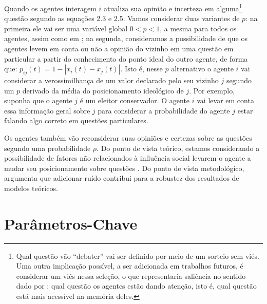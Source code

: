 Quando os agentes interagem \(i\) atualiza sua opinião e incerteza em
alguma\footnote{Qual questão vão ``debater'' vai ser definido por meio de um
  sorteio sem viés. Uma outra implicação possível, a ser adicionada em trabalhos
  futuros, é considerar um viés nessa seleção, o que representaria saliência no
  sentido dado por : qual questão os agentes estão
  dando atenção, isto é, qual questão está mais acessível na memória deles.}
questão segundo as equações 2.3 e 2.5. Vamos considerar duas variantes de \(p\):
na primeira ele vai ser uma variável global \(0 < p < 1 \), a mesma para todos
os agentes, assim como em ; na segunda,
consideramos a possibilidade de que os agentes levem em conta ou não a opinião
do vizinho em uma questão em particular a partir do conhecimento do ponto ideal
do outro agente, de forma que: \(p_{ij}(t) = 1 - |x_i(t) - x_j(t)|\). Isto é,
nesse \(p\) alternativo o agente \(i\) vai considerar a verossimilhança de um
valor declarado pelo seu vizinho \(j\) segundo um \(p\) derivado da média do
posicionamento ideológico de \(j\). Por exemplo, suponha que o agente \(j\) é um
eleitor conservador. O agente \(i\) vai levar
em conta essa informação geral sobre \(j\) para considerar a probabilidade do
agente \(j\) estar falando algo correto em questões particulares.

Os agentes também vão reconsiderar suas opiniões e certezas sobre as questões
segundo uma probabilidade \(\rho\). Do ponto de vista teórico, estamos considerando
a possibilidade de fatores não relacionados à influência social levarem o agente
a mudar seu posicionamento sobre questões \cite{flache2017, lorenz2017modeling}.
Do ponto de vista metodológico,  argumenta que
adicionar ruído contribui para a robustez dos resultados de modelos
teóricos. 

\section{Parâmetros-Chave}

